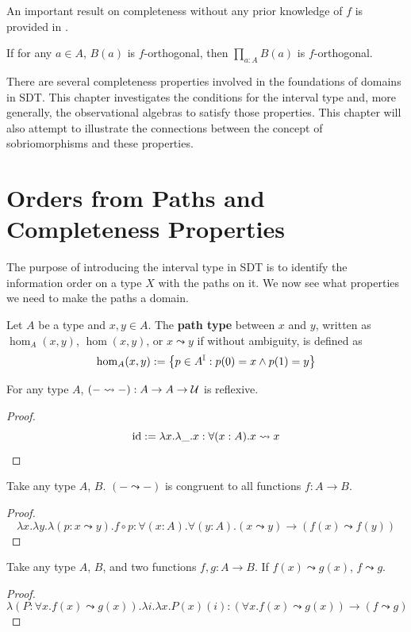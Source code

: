 An important result on completeness without any prior knowledge of $f$ is provided in \cite{reus_general_1997}.
\begin{theorem}
    \label{thm-prod}
    If for any $a\in A$, $B(a)$ is $f$-orthogonal, then $\prod_{a:A}B(a)$ is $f$-orthogonal.
\end{theorem}

There are several completeness properties involved in the foundations of domains in SDT. This chapter investigates the conditions for the interval type and, more generally, the observational algebras to satisfy those properties. This chapter will also attempt to illustrate the connections between the concept of sobriomorphisms and these properties.

\section{Orders from Paths and Completeness Properties}
\label{sect-order}

The purpose of introducing the interval type in SDT is to identify the information order on a type $X$ with the paths on it. We now see what properties we need to make the paths a domain.
\begin{definition}
    Let $A$ be a type and $x,y\in A$. The \textbf{path type} between $x$ and $y$, written as $\hom_A(x,y)$, $\hom(x,y)$, or $x\leadsto y$ if without ambiguity, is defined as
    $$\hom_A(x,y):=\left\{p\in A^{\mathbb{I}}:p(0)=x\wedge p(1)=y\right\}$$
\end{definition}
\begin{lemma}
    For any type $A$, $(-\leadsto-):A\to A\to \mathcal{U}$ is reflexive.
\end{lemma}
\begin{proof}
    $$\operatorname{id}:=\lambda x.\lambda\_.x:\forall(x:A).x\leadsto x$$
\end{proof}
\begin{lemma}
    Take any type $A$, $B$. $(-\leadsto-)$ is congruent to all functions $f:A\to B$.
\end{lemma}
\begin{proof}
    $$\lambda x.\lambda y.\lambda(p:x\leadsto y).f\circ p:\forall(x:A).\forall(y:A).(x\leadsto y)\to(f(x)\leadsto f(y))$$
\end{proof}
\begin{lemma}
    Take any type $A$, $B$, and two functions $f,g:A\to B$. If $f(x)\leadsto g(x)$, $f\leadsto g$.
\end{lemma}
\begin{proof}
    $$\lambda(P:\forall x.f(x)\leadsto g(x)).\lambda i.\lambda x.P(x)(i):(\forall x.f(x)\leadsto g(x))\to(f\leadsto g)$$
\end{proof}

